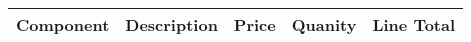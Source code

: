 \begin{center}
  \begin{tabular}{| l | l | l | l | l |}
    \hline
    \bf{Component} & \bf{Description} & \bf{Price} & \bf{Quanity}  & \bf{Line Total}\\ \hline

    \hline
  \end{tabular}
\label{Pi2XBeeTable}
\end{center}